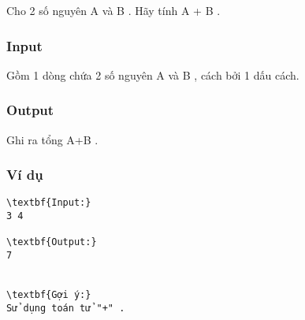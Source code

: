 



   Cho 2 số nguyên A và B . Hãy tính A + B .  

\subsubsection{   Input  }

   Gồm 1 dòng chứa 2 số nguyên A và B , cách bởi 1 dấu cách.  

\subsubsection{   Output  }

   Ghi ra tổng A+B .  

\subsubsection{   Ví dụ  }
\begin{verbatim}
\textbf{Input:}
3 4

\textbf{Output:}
7


\textbf{Gợi ý:}
Sử dụng toán tử "+" .
\end{verbatim}